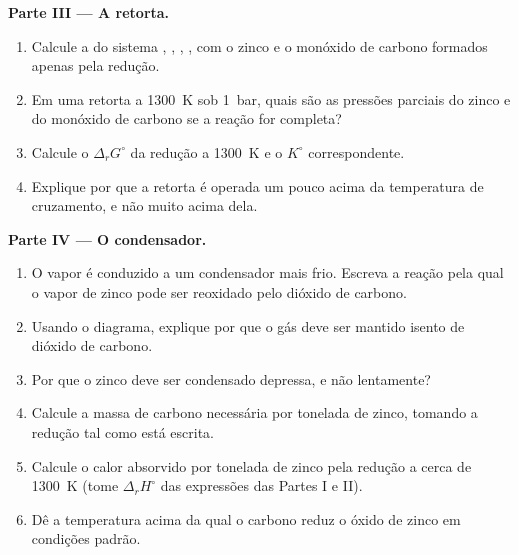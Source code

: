 \begin{problem}
\medskip
\noindent\textbf{Parte III --- A retorta.}
\begin{enumerate}[resume]
  \item Calcule a  do sistema , , ,
        , com o zinco e o monóxido de carbono formados apenas pela redução.
  \item Em uma retorta a \qty{1300}{K} sob \qty{1}{bar}, quais são as pressões
        parciais do zinco e do monóxido de carbono se a reação for completa?
  \item Calcule o $\Delta_r G^\circ$ da redução a \qty{1300}{K} e o
        $K^\circ$ correspondente.
  \item Explique por que a retorta é operada um pouco acima da temperatura de
        cruzamento, e não muito acima dela.
\end{enumerate}

\medskip
\noindent\textbf{Parte IV --- O condensador.}
\begin{enumerate}[resume]
  \item O vapor é conduzido a um condensador mais frio. Escreva a reação pela
        qual o vapor de zinco pode ser reoxidado pelo dióxido de carbono.
  \item Usando o diagrama, explique por que o gás deve ser mantido isento de
        dióxido de carbono.
  \item Por que o zinco deve ser condensado depressa, e não lentamente?
  \item Calcule a massa de carbono necessária por tonelada de zinco,
        tomando a redução tal como está escrita.
  \item Calcule o calor absorvido por tonelada de zinco pela redução a cerca
        de \qty{1300}{K} (tome $\Delta_r H^\circ$ das expressões das Partes I
        e II).
  \item Dê a temperatura acima da qual o carbono reduz o óxido de zinco em
        condições padrão.
\end{enumerate}
\end{problem}

